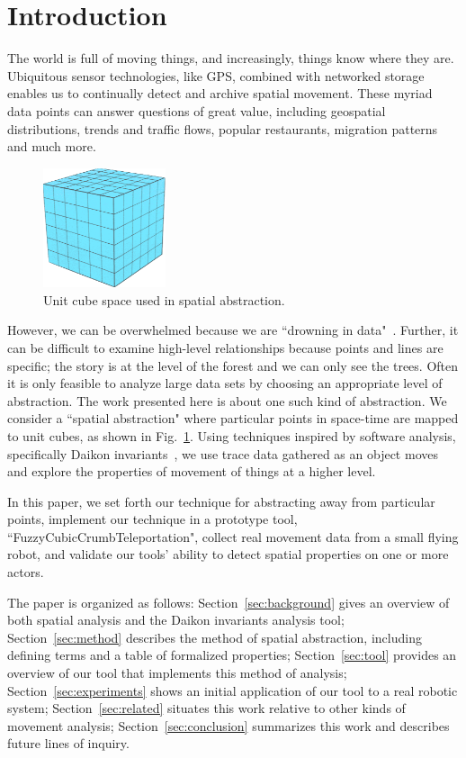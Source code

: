 \section{Introduction}

The world is full of moving things, and increasingly, things know where they are. 
Ubiquitous sensor technologies, like GPS, combined with networked storage enables us to continually detect and archive spatial movement.
These myriad data points can answer questions of great value, including geospatial distributions, trends and traffic flows, popular restaurants, migration patterns and much more.

\begin{figure}
  \centering
  \includegraphics[width=0.32\textwidth]{./figures/unitCube}
  \caption{Unit cube space used in spatial abstraction.}
  \label{fig:unitCubes}
\end{figure}

However, we can be overwhelmed because we are ``drowning in data"~\cite{morse1993drowning}.
Further, it can be difficult to examine high-level relationships because points and lines are specific; the story is at the level of the forest and we can only see the trees.  
Often it is only feasible to analyze large data sets by choosing an appropriate level of abstraction.
The work presented here is about one such kind of abstraction.
We consider a ``spatial abstraction" where particular points in space-time are mapped to unit cubes, as shown in Fig.~\ref{fig:unitCubes}.
Using techniques inspired by software analysis, specifically Daikon invariants~\cite{kataoka2001automated}, we use trace data gathered as an object moves and explore the properties of movement of things at a higher level.

In this paper, we set forth our technique for abstracting away from particular points, 
implement our technique in a prototype tool, ``FuzzyCubicCrumbTeleportation", 
collect real movement data from a small flying robot, 
and validate our tools' ability to detect spatial properties on one or more actors.

The paper is organized as follows:
Section~\ref{sec:background} gives an overview of both spatial analysis and the Daikon invariants analysis tool;
Section~\ref{sec:method} describes the method of spatial abstraction, including defining terms and a table of formalized properties;
Section~\ref{sec:tool} provides an overview of our tool that implements this method of analysis;
Section~\ref{sec:experiments} shows an initial application of our tool to a real robotic system;
Section~\ref{sec:related} situates this work relative to other kinds of movement analysis;
Section~\ref{sec:conclusion} summarizes this work and describes future lines of inquiry. 





